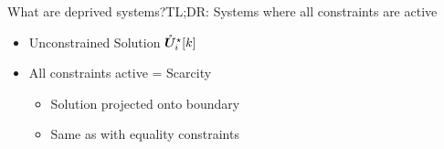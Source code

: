 \documentclass[aspectratio=169]{beamer}
\begin{document}
\begin{frame}{What are deprived systems?}{TL;DR: Systems where all constraints are active}
  \pause
  \centering
  \hspace{-1cm}
    \begin{minipage}[t]{.55\linewidth}
      \begin{itemize}[<+(1)->]
        \item Unconstrained Solution $\mathring{\boldsymbol{U}}^{\star}_i[k]$
        \item All constraints active = Scarcity
              \begin{itemize}
                \item Solution projected onto boundary
                \item Same as with equality constraints\footnotemark

              \end{itemize}
      \end{itemize}

    \end{minipage}
    \quad
    \begin{minipage}[t]{.35\linewidth}
      \small
    \end{minipage}


\end{frame}
\end{document}
